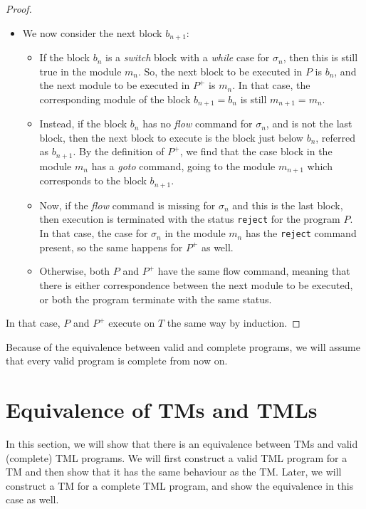 \begin{appendices}
\begin{proof}
\begin{itemize}
\begin{itemize}
            \item We now consider the next block $b_{n+1}$:
            \begin{itemize}
                \item If the block $b_n$ is a \textit{switch} block with a \textit{while} case for $\sigma_n$, then this is still true in the module $m_n$. So, the next block to be executed in $P$ is $b_n$, and the next module to be executed in $P^+$ is $m_n$. In that case, the corresponding module of the block $b_{n+1} = b_n$ is still $m_{n+1} = m_n$.
    
                \item Instead, if the block $b_n$ has no \textit{flow} command for $\sigma_n$, and is not the last block, then the next block to execute is the block just below $b_n$, referred as $b_{n+1}$. By the definition of $P^+$, we find that the case block in the module $m_n$ has a \textit{goto} command, going to the module $m_{n+1}$ which corresponds to the block $b_{n+1}$. 
            
                \item Now, if the \textit{flow} command is missing for $\sigma_n$ and this is the last block, then execution is terminated with the status \texttt{reject} for the program $P$. In that case, the case for $\sigma_n$ in the module $m_n$ has the \texttt{reject} command present, so the same happens for $P^+$ as well. 
            
                \item Otherwise, both $P$ and $P^+$ have the same flow command, meaning that there is either correspondence between the next module to be executed, or both the program terminate with the same status. 
            \end{itemize}
        \end{itemize}
    \end{itemize}
    In that case, $P$ and $P^+$ execute on $T$ the same way by induction.
\end{proof}

Because of the equivalence between valid and complete programs, we will assume that every valid program is complete from now on.

\section{Equivalence of TMs and TMLs}
In this section, we will show that there is an equivalence between TMs and valid (complete) TML programs. We will first construct a valid TML program for a TM and then show that it has the same behaviour as the TM. Later, we will construct a TM for a complete TML program, and show the equivalence in this case as well.


\end{appendices}
